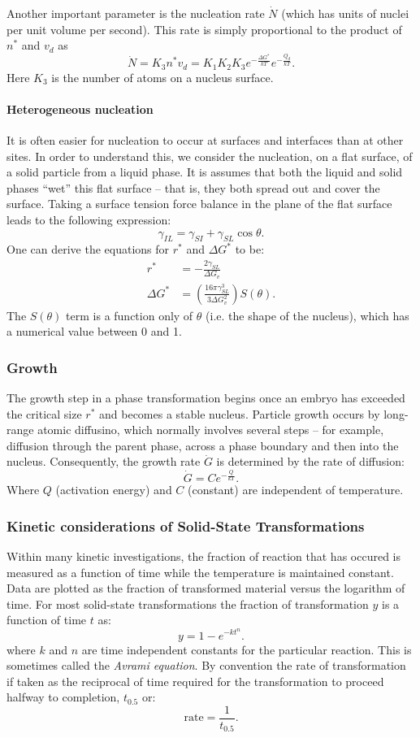 Another important parameter is the nucleation rate $\dot{N}$ (which has units of nuclei per unit volume per second). This rate is simply proportional to the product of $n^{*}$ and $v_d$ as
\[ 
\dot{N} = K_3 n^{*} v_d = K_1 K_2 K_3 e^{- \frac{\Delta G^{*}}{kT}} e^{- \frac{Q_d}{kT}}
.\]
Here $K_3$ is the number of atoms on a nucleus surface.

\paragraph{Heterogeneous nucleation} It is often easier for nucleation to occur at surfaces and interfaces than at other sites. In order to understand this, we consider the nucleation, on a flat surface, of a solid particle from a liquid phase. It is assumes that both the liquid and solid phases ``wet'' this flat surface -- that is, they both spread out and cover the surface. Taking a surface tension force balance in the plane of the flat surface leads to the following expression:
\[ 
\gamma_{IL} = \gamma_{SI} + \gamma_{SL} \cos \theta
.\]
One can derive the equations for $r^{*}$ and $\Delta G^{*}$ to be:
\begin{align*}
  r^{*} &= - \frac{2\gamma_{SL}}{\Delta G_v} \\
  \Delta G^{*} &= \left( \frac{16 \pi \gamma^3_{SL}}{3 \Delta G_v^2} \right) S(\theta)
.\end{align*}
The $S(\theta)$ term is a function only of $\theta$ (i.e. the shape of the nucleus), which has a numerical value between 0 and 1. 


\subsubsection{Growth}
The growth step in a phase transformation begins once an embryo has exceeded the critical size $r^{*}$ and becomes a stable nucleus. Particle growth occurs by long-range atomic diffusino, which normally involves several steps -- for example, diffusion through the parent phase, across a phase boundary and then into the nucleus. Consequently, the growth rate $\dot{G}$ is determined by the rate of diffusion:
\[ 
\dot{G} = C e^{- \frac{Q}{kT}}
.\]
Where $Q$ (activation energy) and $C$ (constant) are independent of temperature. 


\subsubsection{Kinetic considerations of Solid-State Transformations}
Within many kinetic investigations, the fraction of reaction that has occured is measured as a function of time while the temperature is maintained constant. Data are plotted as the fraction of transformed material versus the logarithm of time. For most solid-state transformations the fraction of transformation $y$ is a function of time $t$ as:
\[ 
y = 1 - e^{- kt^{n}}
.\]
where $k$ and $n$ are time independent constants for the particular reaction. This is sometimes called the \textit{Avrami equation}. By convention the rate of transformation if taken as the reciprocal of time required for the transformation to proceed halfway to completion, $t_{\num{0,5} }$ or:
\[ 
\mathrm{rate} = \frac{1}{t_{\num{0,5} }}
.\]

